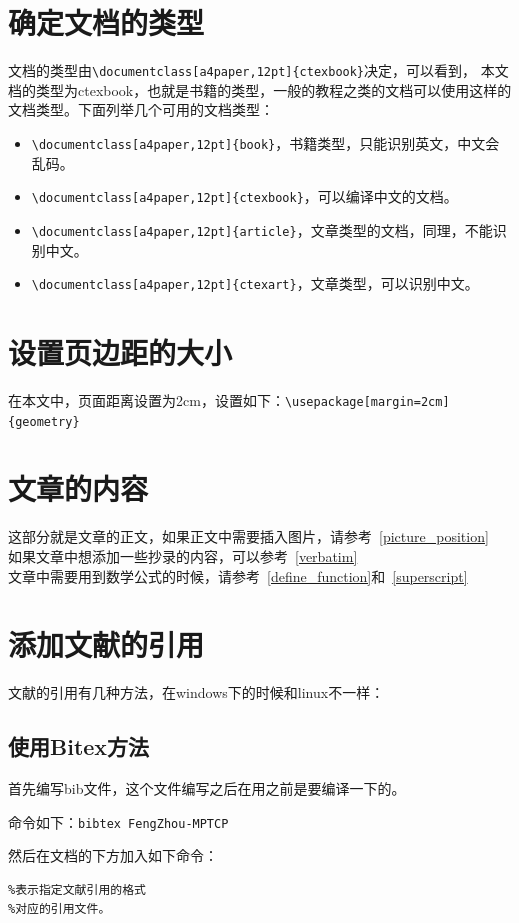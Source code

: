 \documentclass[a4paper,12pt]{ctexbook}
\begin{document}
\begin{flushleft}
\section{确定文档的类型}
文档的类型由\verb|\documentclass[a4paper,12pt]{ctexbook}|决定，可以看到，
本文档的类型为ctexbook，也就是书籍的类型，一般的教程之类的文档可以使用这样的文档类型。下面列举几个可用的文档类型：
\begin{itemize}
	\item \verb|\documentclass[a4paper,12pt]{book}|，书籍类型，只能识别英文，中文会乱码。
	\item \verb|\documentclass[a4paper,12pt]{ctexbook}|，可以编译中文的文档。
	\item \verb|\documentclass[a4paper,12pt]{article}|，文章类型的文档，同理，不能识别中文。
	\item \verb|\documentclass[a4paper,12pt]{ctexart}|，文章类型，可以识别中文。
\end{itemize}

\section{设置页边距的大小}
在本文中，页面距离设置为2cm，设置如下：\verb|\usepackage[margin=2cm]{geometry}|

\section{文章的内容}
这部分就是文章的正文，如果正文中需要插入图片，请参考~\ref{picture_position}\\
如果文章中想添加一些抄录的内容，可以参考~\ref{verbatim}\\
文章中需要用到数学公式的时候，请参考~\ref{define_function}和~\ref{superscript}

\section{添加文献的引用}
文献的引用有几种方法，在windows下的时候和linux不一样：
\subsection{使用Bitex方法}
首先编写bib文件，这个文件编写之后在用之前是要编译一下的。

命令如下：\verb|bibtex FengZhou-MPTCP|

然后在文档的下方加入如下命令：
\begin{verbatim}
%表示指定文献引用的格式
%对应的引用文件。
\end{verbatim}


\end{flushleft}
\end{document}
